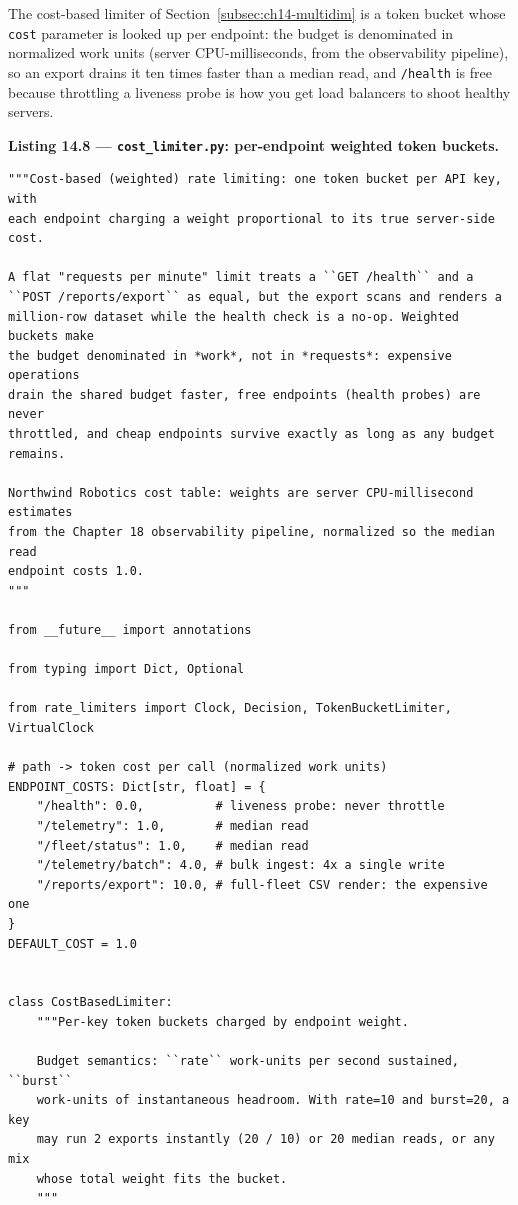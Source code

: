 The cost-based limiter of Section~\ref{subsec:ch14-multidim} is a token
bucket whose \texttt{cost} parameter is looked up per endpoint: the budget
is denominated in normalized work units (server CPU-milliseconds, from the
observability pipeline), so an export drains it ten times faster than a
median read, and \texttt{/health} is free because throttling a liveness
probe is how you get load balancers to shoot healthy servers.

\noindent\textbf{Listing 14.8 --- \texttt{cost\_limiter.py}: per-endpoint
weighted token buckets.}
\label{lst:ch14-cost}
\begin{verbatim}
"""Cost-based (weighted) rate limiting: one token bucket per API key, with
each endpoint charging a weight proportional to its true server-side cost.

A flat "requests per minute" limit treats a ``GET /health`` and a
``POST /reports/export`` as equal, but the export scans and renders a
million-row dataset while the health check is a no-op. Weighted buckets make
the budget denominated in *work*, not in *requests*: expensive operations
drain the shared budget faster, free endpoints (health probes) are never
throttled, and cheap endpoints survive exactly as long as any budget
remains.

Northwind Robotics cost table: weights are server CPU-millisecond estimates
from the Chapter 18 observability pipeline, normalized so the median read
endpoint costs 1.0.
"""

from __future__ import annotations

from typing import Dict, Optional

from rate_limiters import Clock, Decision, TokenBucketLimiter, VirtualClock

# path -> token cost per call (normalized work units)
ENDPOINT_COSTS: Dict[str, float] = {
    "/health": 0.0,          # liveness probe: never throttle
    "/telemetry": 1.0,       # median read
    "/fleet/status": 1.0,    # median read
    "/telemetry/batch": 4.0, # bulk ingest: 4x a single write
    "/reports/export": 10.0, # full-fleet CSV render: the expensive one
}
DEFAULT_COST = 1.0


class CostBasedLimiter:
    """Per-key token buckets charged by endpoint weight.

    Budget semantics: ``rate`` work-units per second sustained, ``burst``
    work-units of instantaneous headroom. With rate=10 and burst=20, a key
    may run 2 exports instantly (20 / 10) or 20 median reads, or any mix
    whose total weight fits the bucket.
    """


\end{verbatim}

